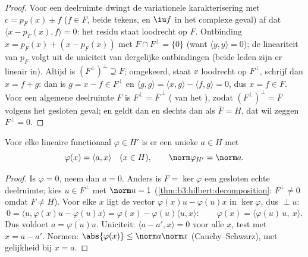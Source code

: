 \begin{proof}
Voor een deelruimte dwingt de variationele karakterisering met $c
= p_F(x) \pm f$ ($f \in F$, beide tekens, en $\iu f$ in het
complexe geval) af dat $\langle x - p_F(x), f\rangle = 0$: het
residu staat loodrecht op $F$. Ontbinding $x = p_F(x) + (x -
p_F(x))$ met $F \cap F^\perp = \{0\}$ (want $\langle y, y \rangle
= 0$); de lineariteit van $p_F$ volgt uit de uniciteit van
dergelijke ontbindingen (beide leden zijn er lineair in). Altijd
is $(F^\perp)^\perp \supseteq F$; omgekeerd, staat $x$ loodrecht
op $F^\perp$, schrijf dan $x = f + g$: dan is $g = x - f \in
F^\perp$ en $\langle g, g\rangle = \langle x, g\rangle - \langle
f, g\rangle = 0$, dus $x = f \in F$. Voor een algemene deelruimte
$F$ is $F^\perp = \bar F^{\,\perp}$ ( van het
), zodat $(F^\perp)^\perp = \bar F$ volgens het
gesloten geval; en  geldt dan en slechts dan als $\bar F
= H$, dat wil zeggen $F^\perp = 0$.
\end{proof}

\begin{theorem}\label{thm:b3:hilbert:riesz}
Voor elke  lineaire functionaal $\varphi \in H'$ is er
een unieke $a \in H$ met
\[
\varphi(x) = \langle a, x\rangle \quad (x \in H),
\qquad \norm\varphi_{H'} = \norm a .
\]
\end{theorem}

\begin{proof}
Is $\varphi = 0$, neem dan $a = 0$. Anders is $F = \ker\varphi$
een gesloten echte deelruimte; kies $u \in F^\perp$ met $\norm u
= 1$ (\cref{thm:b3:hilbert:decomposition}: $F^\perp \neq 0$ omdat
$F \neq H$). Voor elke $x$ ligt de vector $\varphi(x)u -
\varphi(u)x$ in $\ker\varphi$, dus $\perp u$:
\[
0 = \langle u, \varphi(x)u - \varphi(u)x\rangle
= \varphi(x) - \varphi(u)\langle u, x\rangle :
\qquad \varphi(x) = \langle
\overline{\varphi(u)}\,u,\ x\rangle .
\]
Dus voldoet $a = \overline{\varphi(u)}u$. Uniciteit: $\langle a -
a', x\rangle = 0$ voor alle $x$, test met $x = a - a'$. Normen:
$\abs{\varphi(x)} \leq \norm a\norm x$ (Cauchy--Schwarz), met
gelijkheid bij $x = a$.
\end{proof}


